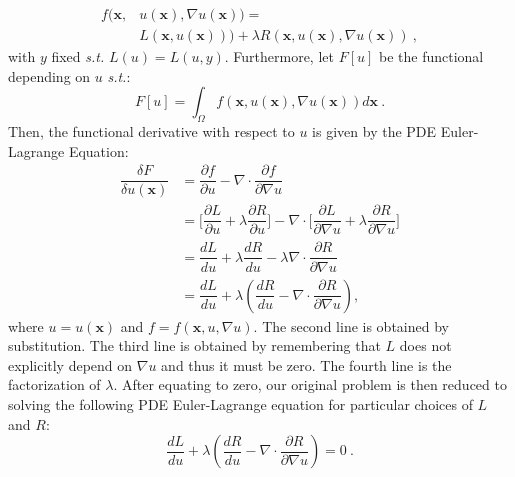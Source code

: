 \documentclass{INGUADY}
\begin{document}
\begin{align*}
f(\mathbf{x}, &u(\mathbf{x}), \nabla u(\mathbf{x})) = \\
&L(\mathbf{x}, u(\mathbf{x}))) + \lambda R(\mathbf{x}, u(\mathbf{x}), \nabla u(\mathbf{x})) \ ,
\end{align*}
with $y$ fixed \textit{s.t.} $L(u) = L(u, y)$. Furthermore, let $F[u]$ be the functional depending on $u$ \textit{s.t.}:
\begin{equation*}
F[u] = \int_\Omega f(\mathbf{x}, u(\mathbf{x}), \nabla u(\mathbf{x})) d\mathbf{x} \ .
\end{equation*}
Then, the functional derivative with respect to $u$ is given by the PDE Euler-Lagrange Equation:
\begin{align}
\dfrac{\delta F}{\delta u(\mathbf{x})} &= \dfrac{\partial f}{\partial u} - \nabla \cdot \dfrac{\partial f}{\partial \nabla u} \label{eq:t}
\\ &= \Big[ \dfrac{\partial L}{\partial u} +  \lambda \dfrac{\partial R}{\partial u}  \Big] - \nabla \cdot \Big[   \dfrac{\partial L}{\partial \nabla u} + \lambda \dfrac{\partial R}{\partial \nabla u}   \Big]
\\ &= \dfrac{dL}{du} + \lambda \dfrac{dR}{du} - \lambda \nabla \cdot \dfrac{\partial R}{\partial \nabla u}
\\ &= \dfrac{dL}{du} + \lambda (\dfrac{dR}{du} - \nabla \cdot \dfrac{\partial R}{\partial \nabla u}),
\end{align}
where $u = u(\mathbf{x})$ and $f = f(\mathbf{x}, u, \nabla u)$. The second line is obtained by substitution. The third line is obtained by remembering that $L$ does not explicitly depend on $\nabla u$ and thus it must be zero. The fourth line is the factorization of $\lambda$. After equating to zero, our original problem is then reduced to solving the following PDE Euler-Lagrange equation for particular choices of $L$ and $R$:
\begin{equation}\label{eq:general_eq}
\dfrac{dL}{du} + \lambda (\dfrac{dR}{du} - \nabla \cdot \dfrac{\partial R}{\partial \nabla u}) = 0 \ .
\end{equation}
\end{document}
